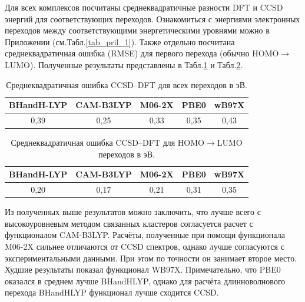 \documentclass[a4paper,12pt]{article}
\newcommand{\rarr}{\rightarrow}
\newcommand{\ths}{\thinspace}
\begin{document}
\begin{onehalfspace}
	Для всех комплексов посчитаны среднеквадратичные разности DFT и CCSD энергий для соответствующих переходов. Ознакомиться с энергиями электронных переходов между соответствующими энергетическими уровнями можно в Приложении (см.\ths Табл.\ths\ref{tab_pril_1}). Также отдельно посчитана среднеквадратичная ошибка (RMSE) для первого перехода (обычно HOMO$\rarr$LUMO). Полученные результаты представлены в Табл.\ths\ref{tab_bench_1} и Табл.\ths\ref{tab_bench_2}.
	
	\begin{table}[H]
		\caption{Среднеквадратичная ошибка CCSD–DFT для всех переходов в эВ.}
		\label{tab_bench_1}
		\centering
		\begin{tabular}{|c|c|c|c|c|}
			\hline
			BHandH-LYP	&	CAM-B3LYP	& M06-2X	& PBE0	& wB97X	 	\\ \hline
			0,39		&   0,25		& 0,33		& 0,35	& 0,43	 	\\ \hline
		\end{tabular}
	\end{table}

	\begin{table}[H]
		\caption{Среднеквадратичная ошибка CCSD–DFT для HOMO$\rarr$LUMO переходов в эВ.}
		\label{tab_bench_2}
		\centering
		\begin{tabular}{|c|c|c|c|c|}
			\hline
			BHandH-LYP	&	CAM-B3LYP	& M06-2X	& PBE0	& wB97X 	\\ \hline
			0,20		&   0,17		& 0,21		& 0,31	& 0,35 		\\ \hline
		\end{tabular}
	\end{table}	
	
	Из полученных выше результатов можно заключить, что лучше всего с высокоуровневым методом связанных кластеров согласуется расчет с функционалом CAM-B3LYP. Расчёты, полученные при помощи функционала M06-2X сильнее отличаются от CCSD спектров, однако лучше согласуются с экспериментальными данными. При этом по точности он занимает второе место. Худшие результаты показал функционал WB97X. Примечательно, что PBE0 оказался в среднем лучше BHandHLYP, однако для расчёта длинноволнового перехода BHandHLYP функционал лучше сходится CCSD.
	

\end{onehalfspace}
\end{document}
